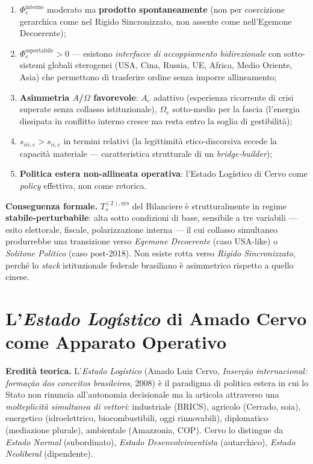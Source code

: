 \begin{enumerate}
\def\labelenumi{\arabic{enumi}.}
\tightlist
\item
  \(\Phi_e^{\text{interno}}\) moderato ma \textbf{prodotto
  spontaneamente} (non per coercizione gerarchica come nel Rigido
  Sincronizzato, non assente come nell'Egemone Decoerente);
\item
  \(\Phi_e^{\text{esportabile}} > 0\) --- esistono \emph{interfacce di
  accoppiamento bidirezionale} con sotto-sistemi globali eterogenei
  (USA, Cina, Russia, UE, Africa, Medio Oriente, Asia) che permettono di
  trasferire ordine senza imporre allineamento;
\item
  \textbf{Asimmetria \(A\)/\(\Omega\) favorevole}: \(A_e\) adattivo
  (esperienza ricorrente di crisi superate senza collasso
  istituzionale), \(\Omega_e\) sotto-medio per la fascia (l'energia
  dissipata in conflitto interno cresce ma resta entro la soglia di
  gestibilità);
\item
  \(s_{iii,e} > s_{ii,e}\) in termini relativi (la legittimità
  etico-discorsiva eccede la capacità materiale --- caratteristica
  strutturale di un \emph{bridge-builder});
\item
  \textbf{Politica estera non-allineata operativa}: l'Estado Logístico
  di Cervo come \emph{policy} effettiva, non come retorica.
\end{enumerate}

\Proved{} \textbf{Conseguenza formale.} \(T_s^{(2),\text{sys}}\) del
Bilanciere è strutturalmente in regime \textbf{stabile-perturbabile}:
alta sotto condizioni di base, sensibile a tre variabili --- esito
elettorale, fiscale, polarizzazione interna --- il cui collasso
simultaneo produrrebbe una transizione verso \emph{Egemone Decoerente}
(caso USA-like) o \emph{Solitone Politico} (caso post-2018). Non esiste
rotta verso \emph{Rigido Sincronizzato}, perché lo \emph{stack}
istituzionale federale brasiliano è asimmetrico rispetto a quello
cinese.



\section{\texorpdfstring{L'\emph{Estado Logístico} di Amado Cervo come
Apparato
Operativo}{L'Estado Logístico di Amado Cervo come Apparato Operativo}}\label{lestado-loguxedstico-di-amado-cervo-come-apparato-operativo}

\Hypoth{} \textbf{Eredità teorica.} L'\emph{Estado Logístico} (Amado
Luiz Cervo, \emph{Inserção internacional: formação dos conceitos
brasileiros}, 2008) è il paradigma di politica estera in cui lo Stato
non rinuncia all'autonomia decisionale ma la articola attraverso una
\emph{molteplicità simultanea di vettori}: industriale (BRICS), agricolo
(Cerrado, soia), energetico (idroelettrico, biocombustibili, oggi
rinnovabili), diplomatico (mediazione plurale), ambientale (Amazzonia,
COP). Cervo lo distingue da \emph{Estado Normal} (subordinato),
\emph{Estado Desenvolvimentista} (autarchico), \emph{Estado Neoliberal}
(dipendente).

